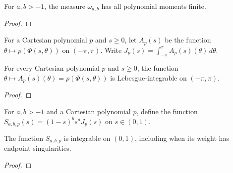 \begin{supporting}
\begin{theorem}
\label{thm:zernike-measure-characterisation}
\leanok
For $a,b>-1$, the measure $\omega_{a,b}$ has all polynomial moments finite.
\end{theorem}
\begin{proof}
\leanok
\end{proof}

\begin{definition}
\label{def:zernike-angular-input}
\leanok
For a Cartesian polynomial $p$ and $s\ge0$, let $A_p(s)$ be the function $\theta\mapsto p(\Phi(s,\theta))$ on $(-\pi,\pi)$. Write $J_p(s)=\int_{-\pi}^{\pi}A_p(s)(\theta)\,d\theta$.
\end{definition}

\begin{theorem}
\label{thm:zernike-angular-input}
\leanok
For every Cartesian polynomial $p$ and $s\ge0$, the function
$\theta\mapsto A_p(s)(\theta)=p(\Phi(s,\theta))$ is Lebesgue-integrable
on $(-\pi,\pi)$.
\end{theorem}
\begin{proof}
\leanok
\end{proof}

\begin{definition}
\label{def:zernike-squared-radius-input}
\leanok
For $a,b>-1$ and a Cartesian polynomial $p$, define the function $S_{a,b,p}(s)=(1-s)^bs^aJ_p(s)$ on $s\in(0,1)$.
\end{definition}

\begin{theorem}
\label{thm:zernike-squared-radius-input}
\leanok
The function $S_{a,b,p}$ is integrable on $(0,1)$, including when its weight has endpoint singularities.
\end{theorem}
\begin{proof}
\leanok
\end{proof}


\end{supporting}
